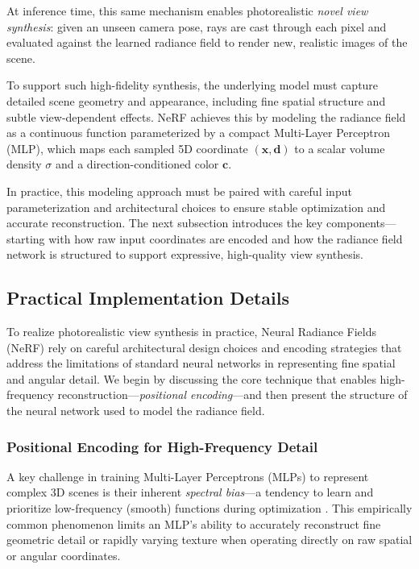 At inference time, this same mechanism enables photorealistic \emph{novel view synthesis}: given an unseen camera pose, rays are cast through each pixel and evaluated against the learned radiance field to render new, realistic images of the scene.

\newpage

To support such high-fidelity synthesis, the underlying model must capture detailed scene geometry and appearance, including fine spatial structure and subtle view-dependent effects. NeRF achieves this by modeling the radiance field as a continuous function parameterized by a compact Multi-Layer Perceptron (MLP), which maps each sampled 5D coordinate \( (\mathbf{x}, \mathbf{d}) \) to a scalar volume density \( \sigma \) and a direction-conditioned color \( \mathbf{c} \).

In practice, this modeling approach must be paired with careful input parameterization and architectural choices to ensure stable optimization and accurate reconstruction. The next subsection introduces the key components—starting with how raw input coordinates are encoded and how the radiance field network is structured to support expressive, high-quality view synthesis.

\subsection{Practical Implementation Details}
\label{subsec:chapter23_practical_nerf}

To realize photorealistic view synthesis in practice, Neural Radiance Fields (NeRF) rely on careful architectural design choices and encoding strategies that address the limitations of standard neural networks in representing fine spatial and angular detail. We begin by discussing the core technique that enables high-frequency reconstruction—\emph{positional encoding}—and then present the structure of the neural network used to model the radiance field.

\subsubsection{Positional Encoding for High-Frequency Detail}
\label{subsubsec:chapter23_nerf_positional_encoding}

A key challenge in training Multi-Layer Perceptrons (MLPs) to represent complex 3D scenes is their inherent \emph{spectral bias}—a tendency to learn and prioritize low-frequency (smooth) functions during optimization \cite{rahaman2019_spectralbias}. This empirically common phenomenon limits an MLP's ability to accurately reconstruct fine geometric detail or rapidly varying texture when operating directly on raw spatial or angular coordinates.

